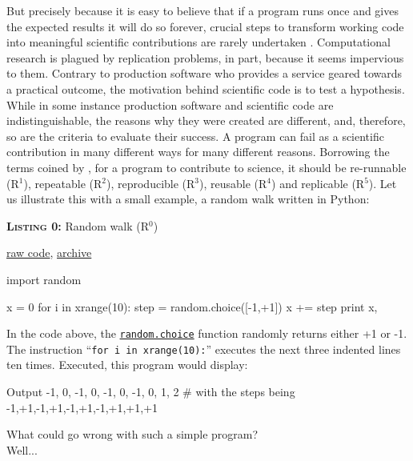 \documentclass[a4paper,11pt]{article}
\begin{document}
But precisely because it is easy to believe that if a program runs once and
gives the expected results it will do so forever, crucial steps to transform
working code into meaningful scientific contributions are rarely undertaken
\citep{Collberg:2016,Sandve:2013,Schwab:2000}. Computational research is plagued by replication
problems, in part, because it seems impervious to them. Contrary to production software who provides a service geared towards a practical outcome, the motivation behind scientific code is to test a hypothesis. While in some instance production software and scientific code are indistinguishable, the reasons why they were created are different, and, therefore, so are the criteria to evaluate their success. A program can
fail as a scientific contribution in many different ways for many different
reasons. Borrowing the terms coined by \citeauthor{Goble:2016}
\citep{Goble:2016}, for a program to contribute to science, it should be
re-runnable (R$^1$), repeatable (R$^2$), reproducible (R$^3$),
reusable (R$^4$) and replicable (R$^5$). Let us illustrate this with a small
example, a random walk \citep{Hughes:1995} written in Python:\\

\noindent \begin{minipage}[c]{\linewidth}
\begin{code}{\parbox{.8\textwidth}{\textbf{\textsc{Listing 0:}} Random walk (R$^0$)}\parbox{.161\textwidth}{\hfill \href{https://raw.githubusercontent.com/rougier/random-walk/frontiers/random-walk-R0.py}{raw code}, \href{https://doi.org/10.5281/zenodo.848217}{archive}}}
import random

x = 0
for i in xrange(10):
    step = random.choice([-1,+1])
    x += step
    print x,
\end{code}
\end{minipage}

\vspace{1.5em}

In the code above, the {\tt \href{https://docs.python.org/3.6/library/random.html#random.choice}{random.choice}} function randomly returns either +1 or -1. The instruction \enquote{\tt for i in xrange(10):}  executes the next three indented lines ten times. Executed, this program would display:
\begin{code}{Output}
-1, 0, -1, 0, -1, 0, -1, 0, 1, 2
# with the steps being -1,+1,-1,+1,-1,+1,-1,+1,+1,+1
\end{code}

What could go wrong with such a simple program?\\
\vfill
Well...
\vfill
\end{document}
